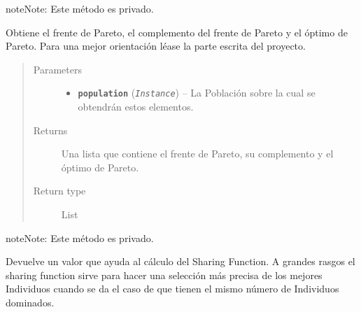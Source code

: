 \documentclass[class=report, crop=false]{standalone}
\begin{document}
\begin{fulllineitems}
\begin{fulllineitems}
\end{fulllineitems}

\begin{fulllineitems}


\begin{notice}{note}{Note:}
Este método es privado.
\end{notice}

Obtiene el frente de Pareto, el complemento del frente de Pareto y 
el óptimo de Pareto.\break
Para una mejor orientación léase la parte escrita del proyecto.

\begin{quote}\begin{description}
\item[{Parameters}] \leavevmode\begin{itemize}
\item \textbf{\texttt{population}} (\emph{\texttt{Instance}}) -- La Población sobre la cual se obtendrán estos elementos.
\end{itemize}
\item[{Returns}] \leavevmode
Una lista que contiene el frente de Pareto, su complemento y el óptimo de Pareto.
\item[{Return type}] \leavevmode
List
\end{description}\end{quote}

\end{fulllineitems}

\begin{fulllineitems}


\begin{notice}{note}{Note:}
Este método es privado.
\end{notice}

Devuelve un valor que ayuda al cálculo del Sharing Function.\break
A grandes rasgos el sharing function sirve para hacer una 
selección más precisa de los mejores Individuos cuando se da el 
caso de que tienen el mismo número de Individuos dominados.


\end{fulllineitems}
\end{fulllineitems}
\end{document}
